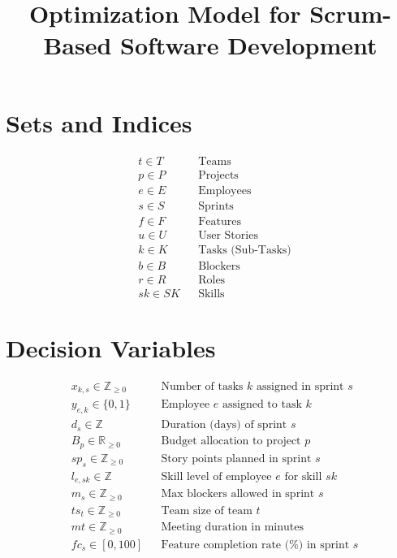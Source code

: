 \documentclass{article}
\begin{document}
\title{Optimization Model for Scrum-Based Software Development}
\author{}
\date{}
\maketitle

\section*{Sets and Indices}
\begin{align*}
& t \in T && \text{Teams} \\
& p \in P && \text{Projects} \\
& e \in E && \text{Employees} \\
& s \in S && \text{Sprints} \\
& f \in F && \text{Features} \\
& u \in U && \text{User Stories} \\
& k \in K && \text{Tasks (Sub-Tasks)} \\
& b \in B && \text{Blockers} \\
& r \in R && \text{Roles} \\
& sk \in SK && \text{Skills}
\end{align*}

\section*{Decision Variables}
\begin{align*}
& x_{k,s} \in \mathbb{Z}_{\geq 0} && \text{Number of tasks } k \text{ assigned in sprint } s \\
& y_{e,k} \in \{0,1\} && \text{Employee } e \text{ assigned to task } k \\
& d_s \in \mathbb{Z} && \text{Duration (days) of sprint } s \\
& B_p \in \mathbb{R}_{\geq 0} && \text{Budget allocation to project } p \\
& sp_s \in \mathbb{Z}_{\geq 0} && \text{Story points planned in sprint } s \\
& l_{e,sk} \in \mathbb{Z} && \text{Skill level of employee } e \text{ for skill } sk \\
& m_s \in \mathbb{Z}_{\geq 0} && \text{Max blockers allowed in sprint } s \\
& ts_t \in \mathbb{Z}_{\geq 0} && \text{Team size of team } t \\
& mt \in \mathbb{Z}_{\geq 0} && \text{Meeting duration in minutes} \\
& fc_s \in [0,100] && \text{Feature completion rate (\%) in sprint } s
\end{align*}
\end{document}
